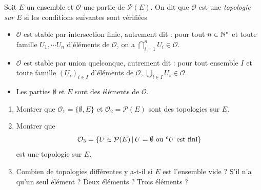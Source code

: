 \begin{exercice}[Topologies]
Soit $E$ un ensemble et  $\mathcal O$ une partie de $\mathcal P(E)$. On dit que $\mathcal O$ est une \emph{topologie sur $E$} si les conditions suivantes sont vérifiées
\begin{itemize}
\item $\mathcal O$ est stable par intersection finie, autrement dit : pour tout $n\in \mathbb{N}^*$ et toute famille $U_1, \cdots U_n$ d'éléments de $\mathcal O$, on a $\bigcap_{i=1}^n U_i\in \mathcal O$.
\item $\mathcal O$ est stable par union quelconque, autrement dit : pour tout ensemble $I$ et toute famille $(U_i)_{i\in I}$ d'éléments de $\mathcal O$, $\bigcup_{i\in I}U_i \in \mathcal O$.
\item Les parties $\emptyset$ et $E$ sont des éléments de $\mathcal O$.
\end{itemize}

\begin{enumerate}
\item Montrer que $\mathcal O_1=\{\emptyset, E\}$ et $\mathcal O_2=\mathcal P(E)$ sont des topologies sur $E$.
\item Montrer que 
\[ \mathcal O_3 = \ensemble{U\in \mathcal P(E)}{U=\emptyset \text{ ou }{}^cU\text{ est fini}}
\]
est une topologie sur $E$.
\item Combien de topologies différentes y a-t-il si $E$ est l'ensemble vide ? S'il n'a qu'un seul élément ? Deux éléments ? Trois éléments ?
\end{enumerate}
\end{exercice}

